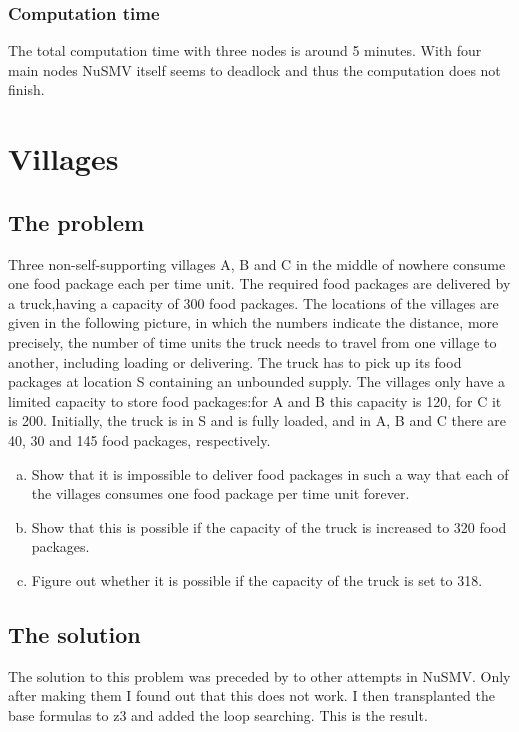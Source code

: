 \documentclass[12pt]{scrartcl}
\begin{document}
\subsubsection{Computation time}
The total computation time with three nodes is around 5 minutes. With four main nodes NuSMV itself seems to deadlock and thus the computation does not finish.

\section{Villages}
\subsection{The problem}
Three non-self-supporting villages A, B and C in the middle of nowhere consume one food package each per time unit.  The required food packages are delivered by a truck,having  a  capacity  of  300  food  packages.   The  locations  of  the  villages  are  given  in the following picture, in which the numbers indicate the distance, more precisely, the number of time units the truck needs to travel from one village to another, including loading or delivering.  The truck has to pick up its food packages at location S containing an unbounded supply.  The villages only have a limited capacity to store food packages:for A and B this capacity is 120, for C it is 200.  Initially, the truck is in S and is fully loaded, and in A, B and C there are 40, 30 and 145 food packages, respectively.
\begin{enumerate}[(a)]
    \item Show that it is impossible to deliver food packages in such a way that each of the villages consumes one food package per time unit forever.
    \item Show  that  this  is  possible  if  the  capacity  of  the  truck  is  increased  to  320  food packages.
    \item Figure out whether it is possible if the capacity of the truck is set to 318.
\end{enumerate}

\subsection{The solution}
The solution to this problem was preceded by to other attempts in NuSMV. Only after making them I found out that this does not work. I then transplanted the base formulas to z3 and added the loop searching. This is the result.
\end{document}
